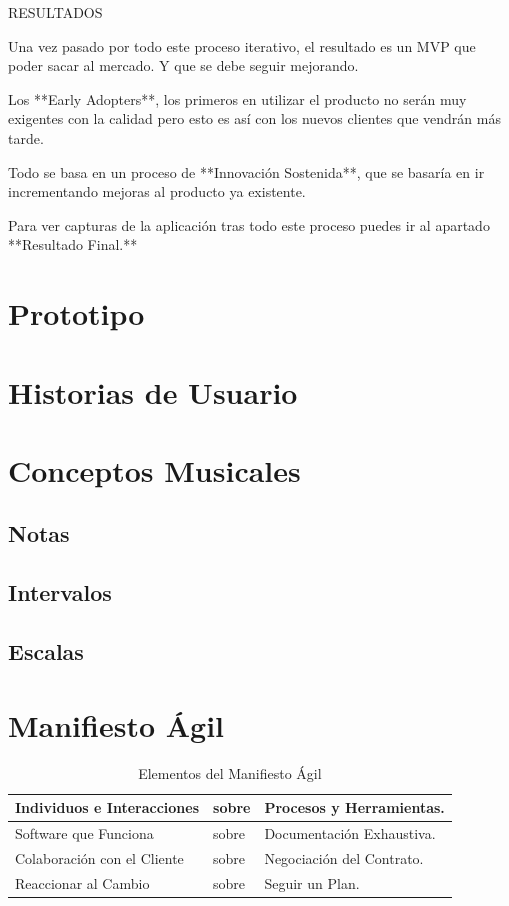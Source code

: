 \documentclass[12pt,twoside,titlepage]{report}
\begin{document}
RESULTADOS

Una vez pasado por todo este proceso iterativo, el resultado es un MVP que poder sacar al mercado. Y que se debe seguir mejorando. 

Los **Early Adopters**, los primeros en utilizar el producto no serán muy exigentes con la calidad pero esto es así con los nuevos clientes que vendrán más tarde. 

Todo se basa en un proceso de **Innovación Sostenida**, que se basaría en ir incrementando mejoras al producto ya existente.

Para ver capturas de la aplicación tras todo este proceso puedes ir al apartado **Resultado Final.**

\chapter{Prototipo}

\chapter{Historias de Usuario}

\chapter{Conceptos Musicales}
\label{sec:apendice}

\section{Notas}
\section{Intervalos}
\section{Escalas}

\chapter{Manifiesto Ágil}

\begin{table}[h]
    \begin{center}
        \begin{tabular}{| l | l | l |}
            \hline
            Individuos e Interacciones & sobre & Procesos y Herramientas. \\ \hline
            Software que Funciona & sobre & Documentación Exhaustiva. \\ \hline
            Colaboración con el Cliente & sobre & Negociación del Contrato. \\ \hline
            Reaccionar al Cambio & sobre & Seguir un Plan. \\ \hline
        \end{tabular}
        \caption{Elementos del Manifiesto Ágil}
        \label{tab:fruta}
    \end{center}
\end{table}
\end{document}
